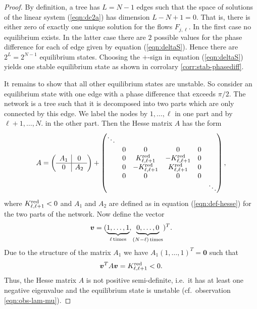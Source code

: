 \documentclass[10pt,aps,pra,onecolumn,superscriptaddress]{revtex4-1}
\newcommand{\be}{\begin{equation}}
\newcommand{\ee}{\end{equation}}
\newcommand{\nn}{\nonumber}
\renewcommand{\vec}[1]{\boldsymbol{#1}}
\begin{document}
\begin{proof}
By definition, a tree has $L=N-1$ edges such that the
space of solutions of the linear system (\ref{eqn:dc2a}) 
has dimension $L-N+1 = 0$. That is, there is either zero
of exactly one unique solution for the flows $F_{j,\ell}$.
In the first case no equilibrium exists. In the latter case
there are $2$ possible values for the phase difference 
for each of edge given by equation (\ref{eqn:deltaS}).
Hence there are $2^L = 2^{N-1}$ equilibrium states.
Choosing the $+$-sign in equation (\ref{eqn:deltaS}) 
yields one stable equilibrium state as shown in corrolary 
\ref{corr:stab-phasediff}.

It remains to show that all other equilibrium states are unstable.
So consider an equilibrium state with one edge with a phase difference 
that exceeds $\pi/2$. The network is a tree such that it is decomposed
into two parts which are only connected by this edge. We label the
nodes by $1,\ldots,\ell$ in one part and by $\ell+1,\ldots,N$.
in the other part. Then the Hesse matrix $A$ has the form
\be
    A  = \left( \begin{array}{c|c}
    A_1 & 0     \\   \hline
    0 & A_2 \\ 
   \end{array} \right) +
    \begin{pmatrix}
       \ddots & & & & \\
       & 0 &0 & 0 & 0 &  \\
        & 0 & K^{\rm red}_{\ell,\ell +1} & -K^{\rm red}_{\ell,\ell +1} & 0 & \\
        & 0 & -K^{\rm red}_{\ell,\ell +1} & K^{\rm red}_{\ell,\ell +1} & 0 & \\
       & 0 & 0 & 0 & 0 & \\
      &  &  & & & \ddots \\
  \end{pmatrix}, \nn
\ee
where $K^{\rm red}_{\ell,\ell +1} < 0$
and $A_1$ and $A_2$ are defined as in equation
(\ref{eqn:def-hesse}) for the two parts of the network.
Now define the vector
\be
   \vec v = ( \underbrace{1,\ldots,1}_{\ell \, {\rm times}},
                     \underbrace{0,\ldots,0}_{(N-\ell) \, {\rm times}} )^T.
\ee
Due to the structure of the matrix $A_1$ we have 
$A_1 (1,\ldots,1)^T = \vec 0$ such that
\be
   \vec v^T A \vec v =  K^{\rm red}_{\ell,\ell +1} < 0.
\ee
Thus, the Hesse matrix $A$ is not positive semi-definite, 
i.e.~it has at least one negative eigenvalue and the 
equilibrium state is unstable (cf.~observation \ref{eqn:obs-lam-mu}).
\end{proof}
\end{document}

